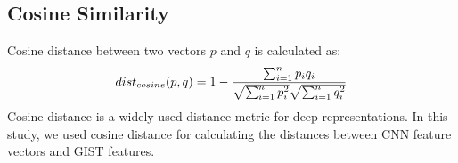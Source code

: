 \subsection{Cosine Similarity}
Cosine distance between two vectors $p$ and $q$ is calculated as:
\begin{equation}
dist_{cosine}(p,q) = 1 - {{\sum_{i=1}^{n}p_{i}q_{i}} \over {\sqrt{\sum_{i=1}^{n}p_{i}^2}} \sqrt{\sum_{i=1}^{n}q_{i}^2}} 
\end{equation}
Cosine distance is a widely used distance metric for deep representations. In this study, we used cosine distance for calculating the distances between CNN feature vectors and GIST features.
























